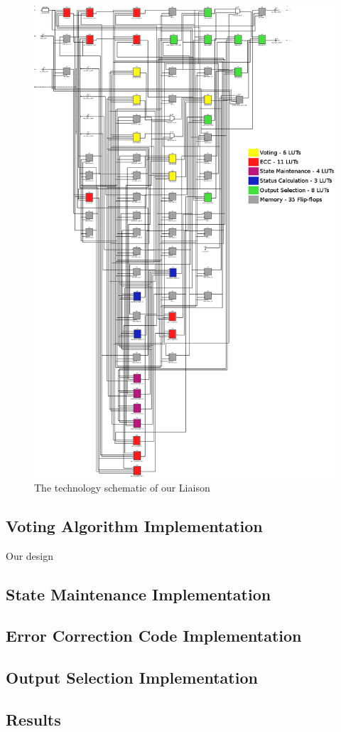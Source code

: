 \begin{figure}[p]
  \vspace*{-1.2in}
  \centerline{ \includegraphics[width=1.2\textwidth]{LUT-count} }
  \caption{The technology schematic of our Liaison}
  \label{fig:technologyschematic}
\end{figure}

\subsection{Voting Algorithm Implementation}
Our design 

\subsection{State Maintenance Implementation}

\subsection{Error Correction Code Implementation}

\subsection{Output Selection Implementation}

\subsection{Results}

